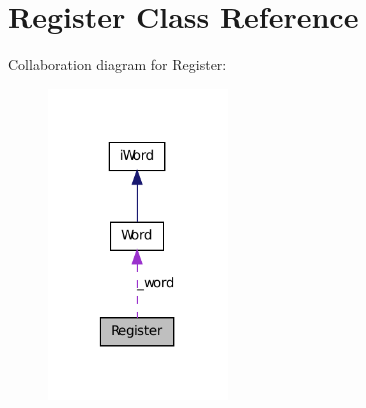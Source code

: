\hypertarget{classRegister}{
\section{Register Class Reference}
\label{classRegister}
}


Collaboration diagram for Register:\nopagebreak
\begin{figure}[H]
\begin{center}
\leavevmode
\includegraphics[width=135pt]{classRegister__coll__graph}
\end{center}
\end{figure}
